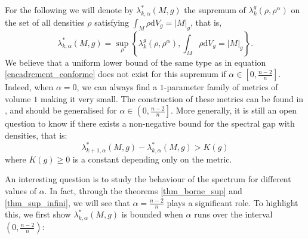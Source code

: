 \documentclass[12pt,reqno]{amsart}		%
\theoremstyle{plain}
\theoremstyle{definition}
\theoremstyle{remark}
\numberwithin{equation}{section}
\renewcommand{\d}{\mathrm{d}}
\begin{document}





For the following we will denote by $\lambda_{k,\alpha}^{*}(M,g)$ the supremum of $\lambda_{k}^g(\rho,\rho^{\alpha})$ on the set of all densities $\rho$ satisfying $\int_{M}\rho \d V_{g}=|M|_{g}$, that is,
\begin{equation*}
\lambda^{*}_{k,\alpha}(M,g)=\underset{\rho}{\sup}\left\{\lambda_{k}^{g}(\rho,\rho^{\alpha}),\int_{M}\rho \d V_{g}=|M|_{g}\right\}.
\end{equation*}
We believe that a uniform lower bound of the same type as in equation \eqref{encadrement_conforme} does not exist for this supremum if $\alpha \in \left[0,\frac{n-2}{n}\right]$. Indeed, when $\alpha = 0$, we can always find a $1$-parameter family of metrics of volume $1$ making it very small. The construction of these metrics can be found in \cite[Theorem 5.1]{colbois_soufi_2019}, and should be generalised for $\alpha \in \left(0,\frac{n-2}{n}\right]$. More generally, it is still an open question to know if there exists a non-negative bound for the spectral gap with densities, that is:
\begin{equation*}
\lambda^{*}_{k+1,\alpha}(M,g)-\lambda^{*}_{k,\alpha}(M,g) > K(g)
\end{equation*}
where $K(g)\geqslant 0$ is a constant depending only on the metric.






An interesting question is to study the behaviour of the spectrum for different values of $\alpha$. In fact, through the theorems \ref{thm_borne_sup} and \ref{thm_sup_infini}, we will see that $\alpha = \frac{n-2}{n}$ plays a significant role.
To highlight this, we first show $\lambda^{*}_{k,\alpha}(M,g)$ is bounded when $\alpha$ runs over the interval $\left(0,\frac{n-2}{n}\right)$:
\end{document}
